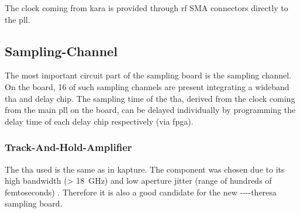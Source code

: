 The clock coming from \gls{kara} is provided through \gls{rf} SMA connectors directly to the \gls{pll}.

\subsection{Sampling-Channel}
The most important circuit part of the sampling board is the sampling channel. 
On the board, 16 of such sampling channels are present integrating a wideband \gls{tha} and delay chip.
The sampling time of the \gls{tha}, derived from the clock coming from the main \gls{pll} on the board, can be delayed individually by programming the delay time of each delay chip respectively (via \gls{fpga}). 

\subsubsection*{Track-And-Hold-Amplifier}
The \gls{tha} used is the same as in \gls{kapture}. 
The component was chosen due to its high bandwidth (> \SI{18}{\GHz}) and low aperture jitter (range of hundreds of femtoseconds) \cite{caselle2013} . 
Therefore it is also a good candidate for the new \gls{----theresa} sampling board.


